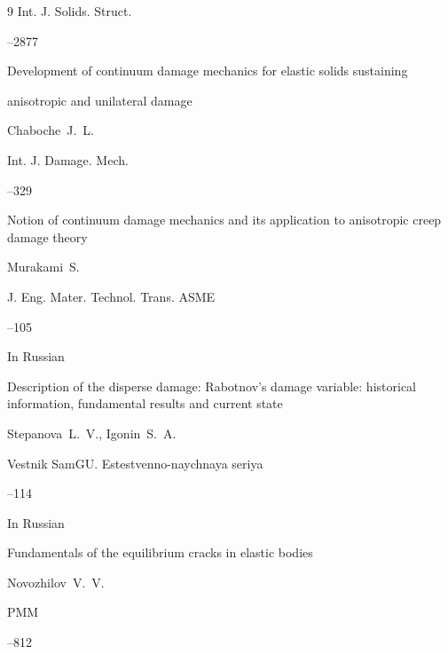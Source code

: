 \begin{thebibliography}{9}
\jour Int. J. Solids. Struct.



--2877




\paper Development of continuum damage mechanics for elastic solids sustaining

anisotropic and unilateral damage

\by Chaboche~J.~L.

\jour Int. J. Damage. Mech.



--329




\paper Notion of continuum damage mechanics and its application to anisotropic creep damage theory

\by Murakami~S.

\jour J. Eng. Mater. Technol. Trans. ASME



--105




\lang In Russian

\paper Description of the disperse damage: Rabotnov's damage variable: historical information, fundamental results and current state

\by Stepanova~L.~V., Igonin~S.~A.

\jour Vestnik SamGU. Estestvenno-naychnaya seriya



--114 




\lang In Russian

\paper Fundamentals of the equilibrium cracks in elastic bodies

\by Novozhilov~V.~V.

\jour PMM



--812





\end{thebibliography}
